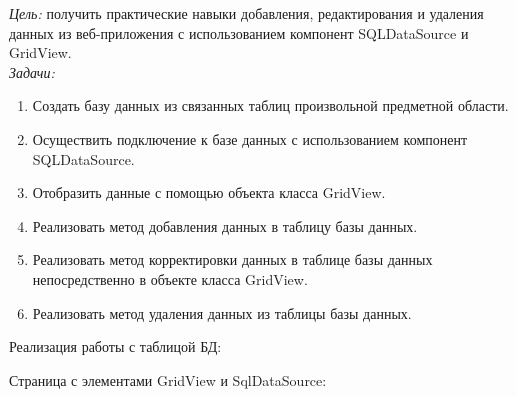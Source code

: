 \documentclass[pscyr]{hedlab}
\begin{document}
    \makeheader
    \emph{Цель:} получить практические навыки добавления, редактирования и удаления данных из 
    веб-приложения с использованием компонент SQLDataSource и GridView.\\
    \emph{Задачи:} 
    \begin{enumerate}
        \item Создать базу данных из связанных таблиц произвольной предметной области.
        \item Осуществить подключение к базе данных с использованием компонент SQLDataSource.
        \item Отобразить данные с помощью объекта класса GridView.
        \item Реализовать метод добавления данных в таблицу базы данных.
        \item Реализовать метод корректировки данных в таблице базы данных непосредственно в 
            объекте класса GridView.
        \item Реализовать метод удаления данных из таблицы базы данных.
    \end{enumerate}
    Реализация работы с таблицой БД:
    
    \pagebreak
    Страница с элементами GridView и SqlDataSource:
    
\end{document}
